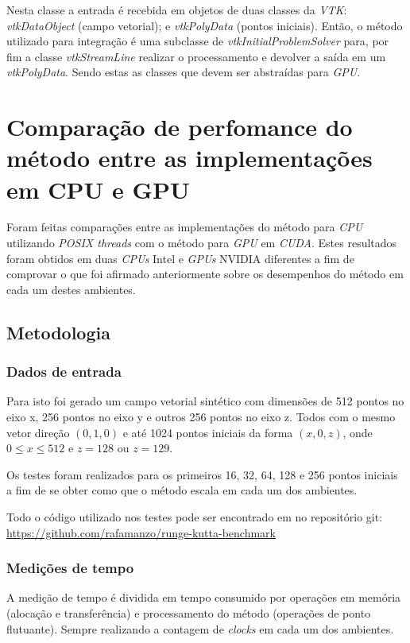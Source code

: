   Nesta classe a entrada é recebida em objetos de duas classes da \textit{VTK}: \textit{vtkDataObject} (campo vetorial); e \textit{vtkPolyData} (pontos iniciais). Então, o método utilizado para integração é uma subclasse de \textit{vtkInitialProblemSolver} para, por fim a classe \textit{vtkStreamLine} realizar o processamento e devolver a saída em um \textit{vtkPolyData}. Sendo estas as classes que devem ser abstraídas para \textit{GPU}.
  
\section{Comparação de perfomance do método entre as implementações em CPU e GPU}
Foram feitas comparações entre as implementações do método para \textit{CPU} utilizando \textit{POSIX threads} com o método para \textit{GPU} em \textit{CUDA}. Estes resultados foram obtidos em duas \textit{CPUs} Intel e \textit{GPUs} NVIDIA diferentes a fim de comprovar o que foi afirmado anteriormente sobre os desempenhos do método em cada um destes ambientes.

  \subsection{Metodologia}
    \subsubsection{Dados de entrada}
    Para isto foi gerado um campo vetorial sintético com dimensões de 512 pontos no eixo x, 256 pontos no eixo y e outros 256 pontos no eixo z. Todos com o mesmo vetor direção $(0, 1, 0)$ e até 1024 pontos iniciais da forma $(x, 0, z)$, onde $0 \leq x \leq 512$ e $z = 128$ ou $z = 129$.
    
    Os testes foram realizados para os primeiros 16, 32, 64, 128 e 256 pontos iniciais a fim de se obter como que o método escala em cada um dos ambientes.
    
    Todo o código utilizado nos testes pode ser encontrado em no repositório git: \href{https://github.com/rafamanzo/runge-kutta-benchmark}{https://github.com/rafamanzo/runge-kutta-benchmark}
    
    \subsubsection{Medições de tempo}
    A medição de tempo é dividida em tempo consumido por operações em memória (alocação e transferência) e processamento do método (operações de ponto flutuante). Sempre realizando a contagem de \textit{clocks} em cada um dos ambientes.
    
